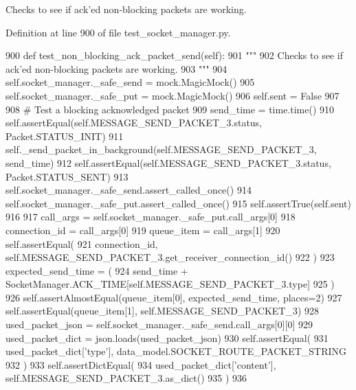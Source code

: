 \begin{DoxyVerb}Checks to see if ack'ed non-blocking packets are working.
\end{DoxyVerb}
 

Definition at line 900 of file test\+\_\+socket\+\_\+manager.\+py.


\begin{DoxyCode}
900     \textcolor{keyword}{def }test\_non\_blocking\_ack\_packet\_send(self):
901         \textcolor{stringliteral}{"""}
902 \textcolor{stringliteral}{        Checks to see if ack'ed non-blocking packets are working.}
903 \textcolor{stringliteral}{        """}
904         self.socket\_manager.\_safe\_send = mock.MagicMock()
905         self.socket\_manager.\_safe\_put = mock.MagicMock()
906         self.sent = \textcolor{keyword}{False}
907 
908         \textcolor{comment}{# Test a blocking acknowledged packet}
909         send\_time = time.time()
910         self.assertEqual(self.MESSAGE\_SEND\_PACKET\_3.status, Packet.STATUS\_INIT)
911         self.\_send\_packet\_in\_background(self.MESSAGE\_SEND\_PACKET\_3, send\_time)
912         self.assertEqual(self.MESSAGE\_SEND\_PACKET\_3.status, Packet.STATUS\_SENT)
913         self.socket\_manager.\_safe\_send.assert\_called\_once()
914         self.socket\_manager.\_safe\_put.assert\_called\_once()
915         self.assertTrue(self.sent)
916 
917         call\_args = self.socket\_manager.\_safe\_put.call\_args[0]
918         connection\_id = call\_args[0]
919         queue\_item = call\_args[1]
920         self.assertEqual(
921             connection\_id, self.MESSAGE\_SEND\_PACKET\_3.get\_receiver\_connection\_id()
922         )
923         expected\_send\_time = (
924             send\_time + SocketManager.ACK\_TIME[self.MESSAGE\_SEND\_PACKET\_3.type]
925         )
926         self.assertAlmostEqual(queue\_item[0], expected\_send\_time, places=2)
927         self.assertEqual(queue\_item[1], self.MESSAGE\_SEND\_PACKET\_3)
928         used\_packet\_json = self.socket\_manager.\_safe\_send.call\_args[0][0]
929         used\_packet\_dict = json.loads(used\_packet\_json)
930         self.assertEqual(
931             used\_packet\_dict[\textcolor{stringliteral}{'type'}], data\_model.SOCKET\_ROUTE\_PACKET\_STRING
932         )
933         self.assertDictEqual(
934             used\_packet\_dict[\textcolor{stringliteral}{'content'}], self.MESSAGE\_SEND\_PACKET\_3.as\_dict()
935         )
936 
\end{DoxyCode}
\mbox{\label{classparlai_1_1mturk_1_1core_1_1test_1_1test__socket__manager_1_1TestSocketManagerRoutingFunctionality_afe86b6f806a1c38a67eea09ba005e0f6}} 
